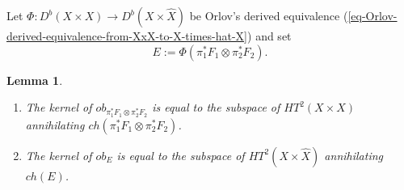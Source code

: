 \documentclass[12pt]{amsart}
\newcommand{\hide}[1]{}
\numberwithin{equation}{subsection}
\theoremstyle{plain}
\newtheorem{lem}[thm]{Lemma}
\theoremstyle{definition}
\newcommand{\CC}{{\mathbb C}}
\newcommand{\ZZ}{{\mathbb Z}}
\newcommand{\Spin}{{\rm Spin}}
\begin{document}
\hide{
The derived monodromy group $\Spin(V)$ of $X$ acts on both spaces 
(??? does it act on $HT^*(X)$ ???) and the action
\[
HT^*(X)\otimes H^*(X,\CC)\rightarrow HT^*(X)
\]
is $\Spin(V)$-equivariant. Hence, the stabilizer $\Spin(V)_P$ of $ch(F_i)$ leaves $\ker(ob_{F_i})$-invariant. 
Hence, the diagonal $\Spin(V)$ action leaves $\ker(ob_{\pi_1^*F_1\otimes\pi_2^*F_2})$ invariant. 
Let $\varphi:H^*(X\times X,\ZZ)\rightarrow H^*(X\times\hat{X},\ZZ)$ be the isomorphism induced by $\Phi$.
The $\varphi\circ \Spin(V)\varphi^{-1}$-action on $H^*(X\times\hat{X},\ZZ)$ is a subgroup of the derived monodromy grooup of $X\times\hat{X}$. Hence it acts also on $HT^*(X\times\hat{X})$. Again, $ch(\Phi(\pi_1^*F_1\otimes\pi_2^*F_2))$ is 
$\varphi\circ \Spin(V)_P\varphi^{-1}$-invariant. Set $E:=\Phi(\pi_1^*F_1\otimes\pi_2^*F_2)$. Then $\ker(ob_E)$ is
$\varphi\circ \Spin(V)_P\varphi^{-1}$-invariant. So the tangent to the $\varphi\circ \Spin(V)_P\varphi^{-1}$-orbit of every element of 
$\ker(ob_E)$ is contained in $\ker(ob_E)$.
}
Let $\Phi:D^b(X\times X)\rightarrow D^b(X\times\hat{X})$ be Orlov's derived equivalence (\ref{eq-Orlov-derived-equivalence-from-XxX-to-X-times-hat-X}) and set
\begin{equation}
\label{eq-E}
E:=\Phi(\pi_1^*F_1\otimes\pi_2^*F_2).
\end{equation} 

\begin{lem}
\label{lemma-kernel-of-ob-E-is-annihilator-of-ch_E}
\begin{enumerate}
\item
\label{lemma-item-kernel-of-ob-F-1-boxtimes-F-2-is-annihilator-of-ch}
The kernel of $ob_{\pi_1^*F_1\otimes\pi_2^*F_2}$ is equal to the subspace of $HT^2(X\times X)$ annihilating 
$ch(\pi_1^*F_1\otimes\pi_2^*F_2)$.
\item
\label{lemma-item-kernel-of-ob-E-is-annihilator-of-ch_E}
The kernel of $ob_{E}$ 
is equal to the subspace of $HT^2(X\times \hat{X})$ annihilating 
$ch(E)$.
\end{enumerate}
\end{lem}
\end{document}
